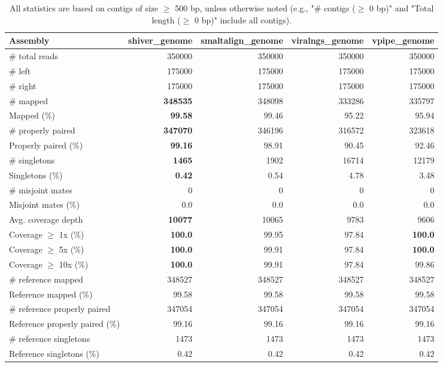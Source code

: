 \documentclass[12pt,a4paper]{article}
\begin{document}
\begin{table}[ht]
\begin{center}
\caption{All statistics are based on contigs of size $\geq$ 500 bp, unless otherwise noted (e.g., "\# contigs ($\geq$ 0 bp)" and "Total length ($\geq$ 0 bp)" include all contigs).}
\begin{tabular}{|l*{4}{|r}|}
\hline
Assembly & shiver\_genome & smaltalign\_genome & viralngs\_genome & vpipe\_genome \\ \hline
\# total reads & 350000 & 350000 & 350000 & 350000 \\ \hline
\# left & 175000 & 175000 & 175000 & 175000 \\ \hline
\# right & 175000 & 175000 & 175000 & 175000 \\ \hline
\# mapped & {\bf 348535} & 348098 & 333286 & 335797 \\ \hline
Mapped (\%) & {\bf 99.58} & 99.46 & 95.22 & 95.94 \\ \hline
\# properly paired & {\bf 347070} & 346196 & 316572 & 323618 \\ \hline
Properly paired (\%) & {\bf 99.16} & 98.91 & 90.45 & 92.46 \\ \hline
\# singletons & {\bf 1465} & 1902 & 16714 & 12179 \\ \hline
Singletons (\%) & {\bf 0.42} & 0.54 & 4.78 & 3.48 \\ \hline
\# misjoint mates & 0 & 0 & 0 & 0 \\ \hline
Misjoint mates (\%) & 0.0 & 0.0 & 0.0 & 0.0 \\ \hline
Avg. coverage depth & {\bf 10077} & 10065 & 9783 & 9606 \\ \hline
Coverage $\geq$ 1x (\%) & {\bf 100.0} & 99.95 & 97.84 & {\bf 100.0} \\ \hline
Coverage $\geq$ 5x (\%) & {\bf 100.0} & 99.91 & 97.84 & {\bf 100.0} \\ \hline
Coverage $\geq$ 10x (\%) & {\bf 100.0} & 99.91 & 97.84 & 99.86 \\ \hline
\# reference mapped & 348527 & 348527 & 348527 & 348527 \\ \hline
Reference mapped (\%) & 99.58 & 99.58 & 99.58 & 99.58 \\ \hline
\# reference properly paired & 347054 & 347054 & 347054 & 347054 \\ \hline
Reference properly paired (\%) & 99.16 & 99.16 & 99.16 & 99.16 \\ \hline
\# reference singletons & 1473 & 1473 & 1473 & 1473 \\ \hline
Reference singletons (\%) & 0.42 & 0.42 & 0.42 & 0.42 \\ \hline

\end{tabular}
\end{center}
\end{table}
\end{document}
